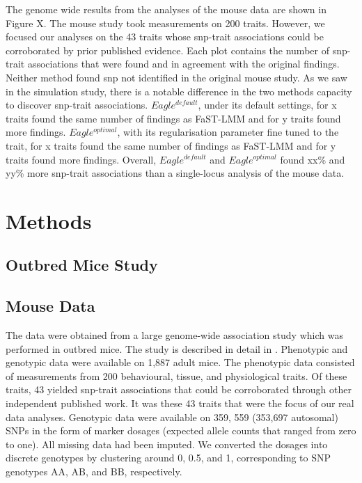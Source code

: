 \documentclass{nature}
\begin{document}
The genome wide results from the analyses of the mouse data are shown in Figure X. The mouse study took
measurements on 200 traits.  However, we focused our analyses on the 43 traits whose snp-trait associations could be
corroborated by prior published evidence. Each plot contains the number of snp-trait associations that were found and in agreement with the original findings. Neither method found snp not identified in the original mouse study.
As we saw in the simulation study, there is a notable difference in the two methods capacity to discover snp-trait associations. $Eagle^{default}$, under its default settings, for x traits found the same number of findings as FaST-LMM and for y traits found more findings. $Eagle^{optimal}$, 
with its regularisation parameter fine tuned to the trait, for x traits found the same number of findings as FaST-LMM and for y traits 
found more findings. Overall, $Eagle^{default}$ and $Eagle^{optimal}$ found xx\% and yy\% more snp-trait associations than a 
single-locus analysis of the mouse data. 



\section{Methods}

\subsection{Outbred Mice Study}
\subsection{Mouse Data}

The data were obtained from a large genome-wide association study which was performed in outbred mice. 
The study is described in detail in \cite{nicod2016genome}. Phenotypic and genotypic data were available on 1,887 adult mice. 
The phenotypic data consisted of measurements from 200 behavioural, tissue, and physiological traits.  Of these traits, 
43 yielded snp-trait associations that could be corroborated through other independent published work. It was these 
43 traits that were the focus of our real data analyses. Genotypic data were available on 359, 559 (353,697 autosomal) SNPs in the 
form of marker dosages (expected allele counts that ranged from zero to one). All missing data had been imputed. 
We converted the dosages into discrete genotypes 
by clustering around 0, 0.5, and 1, corresponding to SNP genotypes AA, AB, and BB, respectively. 
\end{document}
